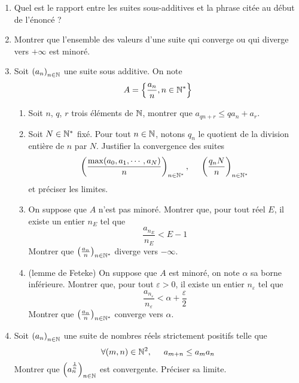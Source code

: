 \begin{enumerate}
 \item Quel est le rapport entre les suites sous-additives et la phrase citée au début de l'énoncé ?
 \item Montrer que l'ensemble des valeurs d'une suite qui converge ou qui diverge vers $+\infty$ est minoré.
 \item Soit $\left( a_n\right) _{n\in \mathbb{N}}$ une suite sous additive. On note 
\begin{displaymath}
 A = \left\lbrace \frac{a_n}{n},n\in \mathbb{N}^*\right\rbrace 
\end{displaymath}
\begin{enumerate}
 \item Soit $n$, $q$, $r$ trois éléments de $\mathbb{N}$, montrer que $a_{qn+r}\leq qa_n+a_r$.
 \item Soit $N\in \mathbb{N}^*$ fixé. Pour tout $n\in\mathbb{N}$, notons $q_n$ le quotient de la division entière de $n$ par $N$. Justifier la convergence des suites
\begin{displaymath}
 \left( \frac{\max(a_0,a_1,\cdots,a_{N})}{n}\right) _{n\in \mathbb{N}^*},\hspace{0.5cm} \left( \frac{q_nN}{n}\right) _{n\in \mathbb{N}^*}
\end{displaymath}
et préciser les limites.
\item On suppose que $A$ n'est pas minoré.\newline
Montrer que, pour tout réel $E$, il existe un entier $n_E$ tel que 
\begin{displaymath}
 \frac{a_{n_E}}{n_E}< E - 1
\end{displaymath}
Montrer que $\left(\frac{a_n}{n} \right) _{n\in \mathbb{N}^*}$ diverge vers $-\infty$.
\item (lemme de Feteke) On suppose que $A$ est minoré, on note $\alpha$ sa borne inférieure.\newline
Montrer que, pour tout $\varepsilon >0$, il existe un entier $n_\varepsilon$ tel que
\begin{displaymath}
 \frac{a_{n_\varepsilon}}{n_\varepsilon}< \alpha + \frac{\varepsilon}{2}
\end{displaymath}
Montrer que $\left(\frac{a_n}{n} \right) _{n\in \mathbb{N}^*}$ converge vers $\alpha$.
\end{enumerate}
\item Soit $\left( a_n\right) _{n\in \mathbb{N}}$ une suite de nombres réels strictement positifs telle que
\begin{displaymath}
 \forall (m,n)\in \mathbb{N}^2, \hspace{0.5cm}a_{m+n}\leq a_ma_n
\end{displaymath}
Montrer que $\left( a_n^{\frac{1}{n}}\right) _{n\in \mathbb{N}}$ est convergente. Préciser sa limite.
\end{enumerate}

